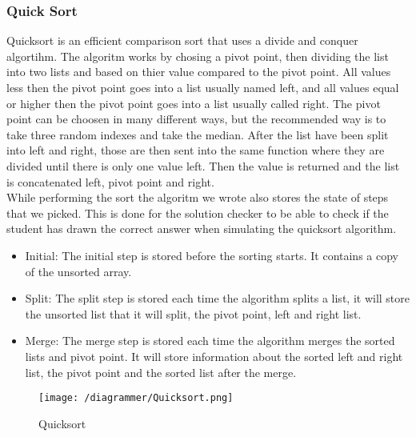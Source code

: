 \subsubsection{Quick Sort}
Quicksort is an efficient comparison sort that uses a divide and conquer algortihm. The algoritm works by chosing a pivot point, then dividing the list into two lists and based on thier value compared to the pivot point. All values less then the pivot point goes into a list usually named left, and all values equal or higher then the pivot point goes into a list usually called right. The pivot point can be choosen in many different ways, but the recommended way is to take three random indexes and take the median. After the list have been split into left and right, those are then sent into the same function where they are divided until there is only one value left. Then the value is returned and the list is concatenated left, pivot point and right.
\\[11pt]
While performing the sort the algoritm we wrote also stores the state of steps that we picked. This is done for the solution checker to be able to check if the student has drawn the correct answer when simulating the quicksort algorithm.
\begin{itemize}
    \item Initial: The initial step is stored before the sorting starts. It contains a copy of the unsorted array.
    \item Split: The split step is stored each time the algorithm splits a list, it will store the unsorted list that it will split, the pivot point, left and right list.
    \item Merge: The merge step is stored each time the algorithm merges the sorted lists and pivot point. It will store information about the sorted left and right list, the pivot point and the sorted list after the merge.
\end{itemize}
\begin{figure}
    \texttt{[image: /diagrammer/Quicksort.png]}
    \caption{Quicksort}
    \label{fig:quicksort}
\end{figure}